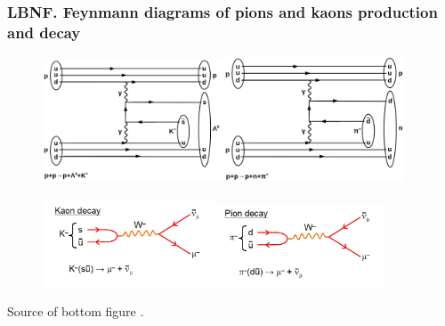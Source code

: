 \begin{frame}\frametitle{LBNF. Feynmann diagrams of pions and kaons production and decay}
\scriptsize
\begin{figure}
\label{fig:pionAndKaonProductions}
\centering
\includegraphics[width=0.48\textwidth, keepaspectratio=true]{figs/ppKaonProduction.png}\includegraphics[width=0.48\textwidth, keepaspectratio=true]{figs/ppPionProduction.png}  
\end{figure}
\begin{figure}
\label{fig:pionAndKaonDecays}
\centering
\includegraphics[width=0.45\textwidth, keepaspectratio=true]{figs/kaonDecay.jpg}\includegraphics[width=0.45\textwidth, keepaspectratio=true]{figs/pionDecay.jpg} 
\end{figure}
\tiny Source of bottom figure \cite{ref_fig_pionandKaonDecays}.
\end{frame}


